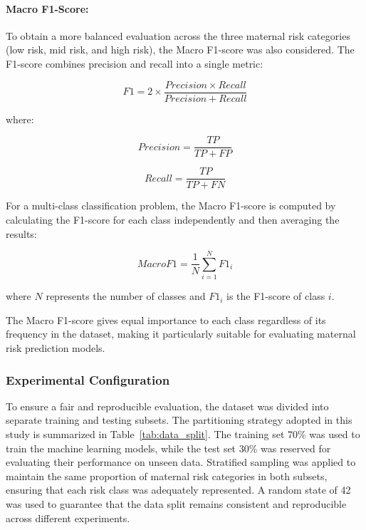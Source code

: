 \paragraph{Macro F1-Score:}

To obtain a more balanced evaluation across the three maternal risk categories (low risk, mid risk, and high risk), the Macro F1-score was also considered. The F1-score combines precision and recall into a single metric:

\begin{equation}
F1 = 2 \times \frac{Precision \times Recall}
{Precision + Recall}
\end{equation}

where:

\begin{equation}
Precision = \frac{TP}{TP + FP}
\end{equation}

\begin{equation}
Recall = \frac{TP}{TP + FN}
\end{equation}

For a multi-class classification problem, the Macro F1-score is computed by calculating the F1-score for each class independently and then averaging the results:

\begin{equation}
MacroF1 = \frac{1}{N}\sum_{i=1}^{N}F1_i
\end{equation}

where $N$ represents the number of classes and $F1_i$ is the F1-score of class $i$.

The Macro F1-score gives equal importance to each class regardless of its frequency in the dataset, making it particularly suitable for evaluating maternal risk prediction models.

\subsubsection{Experimental Configuration}

To ensure a fair and reproducible evaluation, the dataset was divided into separate training and testing subsets. The partitioning strategy adopted in this study is summarized in Table~\ref{tab:data_split}. The training set 70\% was used to train the machine learning models, while the test set 30\% was reserved for evaluating their performance on unseen data. Stratified sampling was applied to maintain the same proportion of maternal risk categories in both subsets, ensuring that each risk class was adequately represented. A random state of 42 was used to guarantee that the data split remains consistent and reproducible across different experiments.


